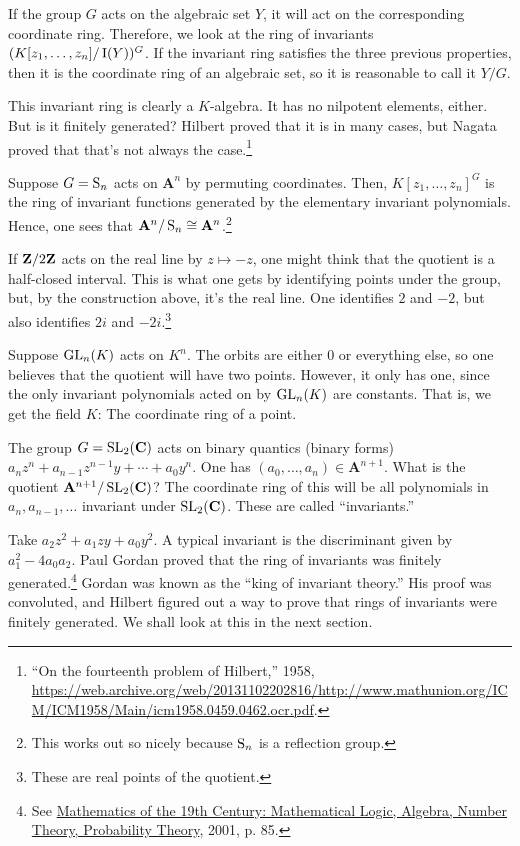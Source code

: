 \documentclass [11 pt, oneside] {article}
\begin{document}
If the group $G$ acts on the algebraic set $Y$, it will act on the corresponding coordinate ring. Therefore, we look at the ring of invariants $(K[z_1,\hdots,z_n]/\operatorname{I}(Y))^G$. If the invariant ring satisfies the three previous properties, then it is the coordinate ring of an algebraic set, so it is reasonable to call it $Y/G$.

This invariant ring is clearly a $K$-algebra. It has no nilpotent elements, either. But is it finitely generated? Hilbert proved that it is in many cases, but Nagata proved that that's not always the case.\footnote{``On the fourteenth problem of Hilbert,'' 1958, \url{https://web.archive.org/web/20131102202816/http://www.mathunion.org/ICM/ICM1958/Main/icm1958.0459.0462.ocr.pdf}.}

\begin{example}[ ]\label{}
Suppose $G=\operatorname{S}_n$ acts on $\mathbf{A}^n$ by permuting coordinates. Then, $K[z_1,\hdots, z_n]^G$ is the ring of invariant functions generated by the elementary invariant polynomials. Hence, one sees that $\mathbf{A}^n/\operatorname{S}_n\cong \mathbf{A}^n$.\footnote{This works out so nicely because $\operatorname{S}_n$ is a reflection group.}
\end{example}


If $\mathbf Z / 2\mathbf Z$ acts on the real line by $z\longmapsto -z$, one might think that the quotient is a half-closed interval. This is what one gets by identifying points under the group, but, by the construction above, it's the real line. One identifies $2$ and $-2$, but also identifies $2i$ and $-2i$.\footnote{These are real points of the quotient.}


 \begin{example}[ ]\label{}
Suppose $\operatorname{GL}_{n}(K)$ acts on $K^n$. The orbits are either $0$ or everything else, so one believes that the quotient will have two points. However, it only has one, since the only invariant polynomials acted on by $\operatorname{GL}_{n}(K)$ are constants. That is, we get the field $K$: The coordinate ring of a point.
\end{example}

\begin{example}\label{}
The group $G=\operatorname{SL}_{2}(\mathbf{C})$ acts on binary quantics (binary forms) $a_nz^n + a_{n-1}z^{n-1}y + \cdots +a_0y^n$. One has $(a_0,\hdots, a_n)\in \mathbf{A}^{n+1}$. What is the quotient $\mathbf{A}^{n+1}/\operatorname{SL}_{2}(\mathbf{C})$? The coordinate ring of this will be all polynomials in $a_n,a_{n-1},\hdots$ invariant under $\operatorname{SL}_{2}(\mathbf{C})$. These are called ``invariants.''

Take $a_2z^2 + a_1zy + a_0y^2$. A typical invariant is the discriminant given by $a_1^2 - 4a_0a_2$. Paul Gordan proved that the ring of invariants was finitely generated.\footnote{See \ul{Mathematics of the 19th Century: Mathematical Logic, Algebra, Number Theory, Probability Theory}, 2001, p. 85.} Gordan was known as the ``king of invariant theory.'' His proof was convoluted, and Hilbert figured out a way to prove that rings of invariants were finitely generated. We shall look at this in the next section.
\end{example}
\end{document}
